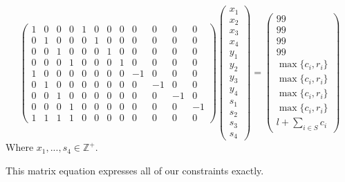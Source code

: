 \documentclass{article}
\begin{document}
\begin{equation}
    \begin{pmatrix}
        1 & 0 & 0 & 0 & 1 & 0 & 0 & 0 & 0 & 0 & 0 & 0 \\
        0 & 1 & 0 & 0 & 0 & 1 & 0 & 0 & 0 & 0 & 0 & 0 \\
        0 & 0 & 1 & 0 & 0 & 0 & 1 & 0 & 0 & 0 & 0 & 0 \\
        0 & 0 & 0 & 1 & 0 & 0 & 0 & 1 & 0 & 0 & 0 & 0 \\
        1 & 0 & 0 & 0 & 0 & 0 & 0 & 0 & -1 & 0 & 0 & 0 \\
        0 & 1 & 0 & 0 & 0 & 0 & 0 & 0 & 0 & -1 & 0 & 0 \\
        0 & 0 & 1 & 0 & 0 & 0 & 0 & 0 & 0 & 0 & -1 & 0 \\
        0 & 0 & 0 & 1 & 0 & 0 & 0 & 0 & 0 & 0 & 0 & -1 \\
        1 & 1 & 1 & 1 & 0 & 0 & 0 & 0 & 0 & 0 & 0 & 0 
    \end{pmatrix}
    \begin{pmatrix}
        x_1 \\
        x_2 \\
        x_3 \\
        x_4 \\
        y_1 \\
        y_2 \\
        y_3 \\
        y_4 \\
        s_1 \\
        s_2 \\
        s_3 \\
        s_4
    \end{pmatrix}
    = \begin{pmatrix}
        99 \\
        99 \\
        99 \\
        99 \\
        \max\{c_i, r_i\} \\
        \max\{c_i, r_i\} \\
        \max\{c_i, r_i\} \\
        \max\{c_i, r_i\} \\
        l + \sum_{i \in S} c_i
    \end{pmatrix}
\end{equation}
Where $x_1, ..., s_4 \in \mathbb{Z}^+$.
\par This matrix equation expresses all of our constraints exactly.
\end{document}
